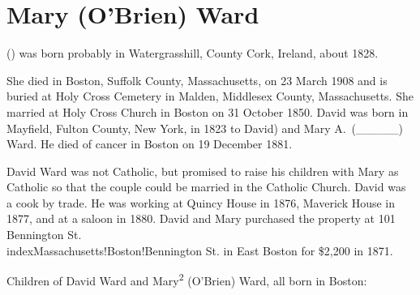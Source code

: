 \section{Mary (O'Brien) Ward}

 () was born probably in Water\-grass\-hill, Coun\-ty Cork, Ireland, about 1828.{\cite{Mary2OBrienMarriage} She died in Boston, Suffolk County, Massachusetts, on 23 March 1908\cite{Mary2OBrienDeath} and is buried at Holy Cross Cemetery in Malden, Middlesex County, Massachusetts.\cite{CarolGordon} She married  at Holy Cross Church in Boston on 31 October 1850.\cite{Mary2OBrienMarriage,Mary2OBrienMarriage2} David was born in Mayfield, Fulton County, New York, in 1823\cite{DavidWardObit} to David) and Mary A.\ (\_\_\_\_\_) Ward.\cite{DavidWardDeath} He died of cancer in Boston on 19 December 1881.\cite{DavidWardDeath}
	
David Ward was not Catholic, but promised to raise his children with Mary as Catholic so that the couple could be married in the Catholic Church.\cite{Mary2OBrienMarriage2} David was a cook by trade. He was working at Quincy House in 1876,\cite{DavidWard1876} Maverick House in 1877,\cite{DavidWard1877} and at a saloon in 1880.\cite{Census1880DavidWard} David and Mary purchased the property at 101 Bennington St.\\index{Massachusetts!Boston!Bennington St.} in East Boston for \$2,200 in 1871.\cite{101Bennington,101BenningtonMap}

\begin{KidsIntro}
	Children of David Ward and Mary\textsuperscript{2} (O'Brien) Ward, all born in Boston:
\end{KidsIntro}

}
